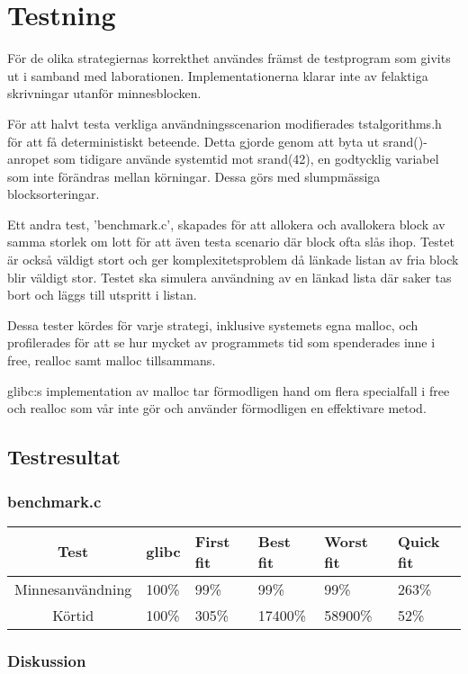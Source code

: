 \documentclass[a4paper,11pt]{article}
\begin{document}
\section*{Testning}

För de olika strategiernas korrekthet användes främst de testprogram som givits ut i samband med laborationen. Implementationerna klarar inte av felaktiga skrivningar utanför minnesblocken.

För att halvt testa verkliga användningsscenarion modifierades tstalgorithms.h för att få deterministiskt beteende. Detta gjorde genom att byta ut srand()-anropet som tidigare använde systemtid mot srand(42), en godtycklig variabel som inte förändras mellan körningar. Dessa görs med slumpmässiga blocksorteringar.

Ett andra test, 'benchmark.c', skapades för att allokera och avallokera block av samma storlek om lott för att även testa scenario där block ofta slås ihop. Testet är också väldigt stort och ger komplexitetsproblem då länkade listan av fria block blir väldigt stor. Testet ska simulera användning av en länkad lista där saker tas bort och läggs till utspritt i listan.

Dessa tester kördes för varje strategi, inklusive systemets egna malloc, och profilerades för att se hur mycket av programmets tid som spenderades inne i free, realloc samt malloc tillsammans.

glibc:s implementation av malloc tar förmodligen hand om flera specialfall i free och realloc som vår inte gör och använder förmodligen en effektivare metod.

\subsection*{Testresultat}

\subsubsection*{benchmark.c}
\begin{tabular}{|c||l|l|l|l|l|}
	\hline
	Test & glibc & First fit & Best fit & Worst fit & Quick fit \\
	\hline
	Minnesanvändning & 100\% & 99\% & 99\% & 99\% & 263\% \\
	Körtid & 100\% & 305\% & 17400\% & 58900\% & 52\%\\
	\hline
\end{tabular}

\subsubsection*{Diskussion}
\end{document}
